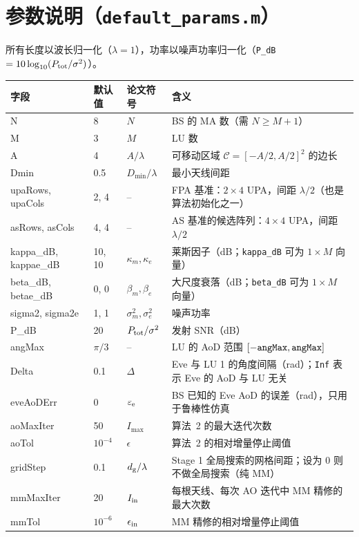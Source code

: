 \documentclass[11pt,a4paper]{ctexart}
\newcommand{\code}[1]{\texttt{#1}}
\newcommand{\Ptot}{P_{\rm tot}}
\begin{document}
\section{参数说明（\code{default\_params.m}）}\label{sec:prm}
所有长度以波长归一化（$\lambda=1$），功率以噪声功率归一化（\code{P\_dB} $=10\log_{10}(\Ptot/\sigma^2)$）。
\begin{longtable}{>{\ttfamily}p{2.5cm}p{1.6cm}p{2.0cm}p{8.9cm}}
\toprule
字段 & 默认值 & 论文符号 & 含义 \\ \midrule
N & 8 & $N$ & BS 的 MA 数（需 $N\ge M+1$）\\
M & 3 & $M$ & LU 数 \\
A & 4 & $A/\lambda$ & 可移动区域 $\mathcal C=[-A/2,A/2]^2$ 的边长 \\
Dmin & 0.5 & $D_{\min}/\lambda$ & 最小天线间距 \\
upaRows, upaCols & 2, 4 & -- & FPA 基准：$2\times4$ UPA，间距 $\lambda/2$（也是算法初始化之一）\\
asRows, asCols & 4, 4 & -- & AS 基准的候选阵列：$4\times4$ UPA，间距 $\lambda/2$ \\
kappa\_dB, kappae\_dB & 10, 10 & $\kappa_m,\kappa_e$ & 莱斯因子（dB；\code{kappa\_dB} 可为 $1\times M$ 向量）\\
beta\_dB, betae\_dB & 0, 0 & $\beta_m,\beta_e$ & 大尺度衰落（dB；\code{beta\_dB} 可为 $1\times M$ 向量）\\
sigma2, sigma2e & 1, 1 & $\sigma_m^2,\sigma_e^2$ & 噪声功率 \\
P\_dB & 20 & $\Ptot/\sigma^2$ & 发射 SNR（dB）\\
angMax & $\pi/3$ & -- & LU 的 AoD 范围 $[-{\tt angMax},{\tt angMax}]$ \\
Delta & 0.1 & $\Delta$ & Eve 与 LU 1 的角度间隔（rad）；\code{Inf} 表示 Eve 的 AoD 与 LU 无关 \\
eveAoDErr & 0 & $\varepsilon_{\rm e}$ & BS 已知的 Eve AoD 的误差（rad），只用于鲁棒性仿真 \\ \midrule
aoMaxIter & 50 & $I_{\max}$ & 算法~2 的最大迭代次数 \\
aoTol & $10^{-4}$ & $\epsilon$ & 算法~2 的相对增量停止阈值 \\
gridStep & 0.1 & $d_{\rm g}/\lambda$ & Stage 1 全局搜索的网格间距；设为 0 则不做全局搜索（纯 MM）\\
mmMaxIter & 20 & $I_{\rm in}$ & 每根天线、每次 AO 迭代中 MM 精修的最大次数 \\
mmTol & $10^{-6}$ & $\epsilon_{\rm in}$ & MM 精修的相对增量停止阈值 \\

\end{longtable}
\end{document}
